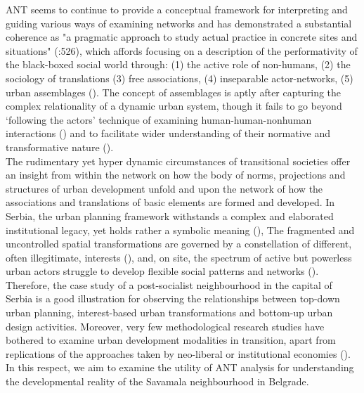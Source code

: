\documentclass[11pt]{report}
\begin{document}
{{{{ANT seems to continue to provide a conceptual framework for interpreting and guiding various ways of examining networks and has demonstrated a substantial coherence as "a pragmatic approach to study actual practice in concrete sites and situations" (\href{Farías}{\citealt{farias_culture_2015}}:526), which affords focusing on a description of the performativity of the black-boxed social world through: (1) the active role of non-humans, (2) the sociology of translations (3) free associations, (4) inseparable actor-networks, (5) urban assemblages (\href{Latour}{\citealt{latour_actor-network_1996}}). The concept of assemblages is aptly after capturing the complex relationality of a dynamic urban system, though it fails to go beyond ‘following the actors’ technique of examining human-human-nonhuman interactions (\href{Cowan}{\citealt{cowan_nominations:_2009}}) and to facilitate wider understanding of their normative and transformative nature (\href{Gabriel}{\citealt{gabriel_post-social_2008}}).
\\

The rudimentary yet hyper dynamic circumstances of transitional societies offer an insight from within the network on how the body of norms, projections and structures of urban development unfold and upon the network of how the associations and translations of basic elements are formed and developed. In Serbia, the urban planning framework withstands a complex and elaborated institutional legacy, yet holds rather a symbolic meaning  (\href{Nedovic}{\citealt{nedovic-budic_adjustment_2001}}), The fragmented and uncontrolled spatial transformations are governed by a constellation of different, often illegitimate, interests  (\href{Petrovic}{\citealt{petrovic_cities_2009}}), and, on site, the spectrum of active but powerless urban actors struggle to develop flexible social patterns and networks (\href{Cvetinovic}{\citealt{cvetinovic_engine_2013}}). Therefore, the case study of a post-socialist neighbourhood in the capital of Serbia is a good illustration for observing the relationships between top-down urban planning, interest-based urban transformations and bottom-up urban design activities. Moreover, very few methodological research studies have bothered to examine urban  development modalities  in  transition,  apart  from  replications  of  the  approaches  taken  by  neo-liberal  or institutional economies (\href{Tsenkova}{\citealt{tsenkova_urban_2007}}). In this respect, we aim to examine the utility of ANT analysis for understanding the developmental reality of the Savamala neighbourhood in Belgrade.

}}}}
\end{document}
